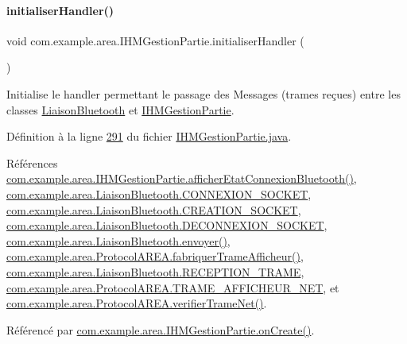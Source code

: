 \paragraph{\texorpdfstring{initialiser\+Handler()}{initialiserHandler()}}
{\footnotesize\ttfamily void com.\+example.\+area.\+I\+H\+M\+Gestion\+Partie.\+initialiser\+Handler (\begin{DoxyParamCaption}{ }\end{DoxyParamCaption})\hspace{0.3cm}{\ttfamily [private]}}



Initialise le handler permettant le passage des Messages (trames reçues) entre les classes \hyperlink{classcom_1_1example_1_1area_1_1_liaison_bluetooth}{Liaison\+Bluetooth} et \hyperlink{classcom_1_1example_1_1area_1_1_i_h_m_gestion_partie}{I\+H\+M\+Gestion\+Partie}. 



Définition à la ligne \hyperlink{_i_h_m_gestion_partie_8java_source_l00291}{291} du fichier \hyperlink{_i_h_m_gestion_partie_8java_source}{I\+H\+M\+Gestion\+Partie.\+java}.



Références \hyperlink{_i_h_m_gestion_partie_8java_source_l00488}{com.\+example.\+area.\+I\+H\+M\+Gestion\+Partie.\+afficher\+Etat\+Connexion\+Bluetooth()}, \hyperlink{_liaison_bluetooth_8java_source_l00036}{com.\+example.\+area.\+Liaison\+Bluetooth.\+C\+O\+N\+N\+E\+X\+I\+O\+N\+\_\+\+S\+O\+C\+K\+ET}, \hyperlink{_liaison_bluetooth_8java_source_l00035}{com.\+example.\+area.\+Liaison\+Bluetooth.\+C\+R\+E\+A\+T\+I\+O\+N\+\_\+\+S\+O\+C\+K\+ET}, \hyperlink{_liaison_bluetooth_8java_source_l00037}{com.\+example.\+area.\+Liaison\+Bluetooth.\+D\+E\+C\+O\+N\+N\+E\+X\+I\+O\+N\+\_\+\+S\+O\+C\+K\+ET}, \hyperlink{_liaison_bluetooth_8java_source_l00202}{com.\+example.\+area.\+Liaison\+Bluetooth.\+envoyer()}, \hyperlink{_protocol_a_r_e_a_8java_source_l00048}{com.\+example.\+area.\+Protocol\+A\+R\+E\+A.\+fabriquer\+Trame\+Afficheur()}, \hyperlink{_liaison_bluetooth_8java_source_l00038}{com.\+example.\+area.\+Liaison\+Bluetooth.\+R\+E\+C\+E\+P\+T\+I\+O\+N\+\_\+\+T\+R\+A\+ME}, \hyperlink{_protocol_a_r_e_a_8java_source_l00039}{com.\+example.\+area.\+Protocol\+A\+R\+E\+A.\+T\+R\+A\+M\+E\+\_\+\+A\+F\+F\+I\+C\+H\+E\+U\+R\+\_\+\+N\+ET}, et \hyperlink{_protocol_a_r_e_a_8java_source_l00117}{com.\+example.\+area.\+Protocol\+A\+R\+E\+A.\+verifier\+Trame\+Net()}.



Référencé par \hyperlink{_i_h_m_gestion_partie_8java_source_l00106}{com.\+example.\+area.\+I\+H\+M\+Gestion\+Partie.\+on\+Create()}.


